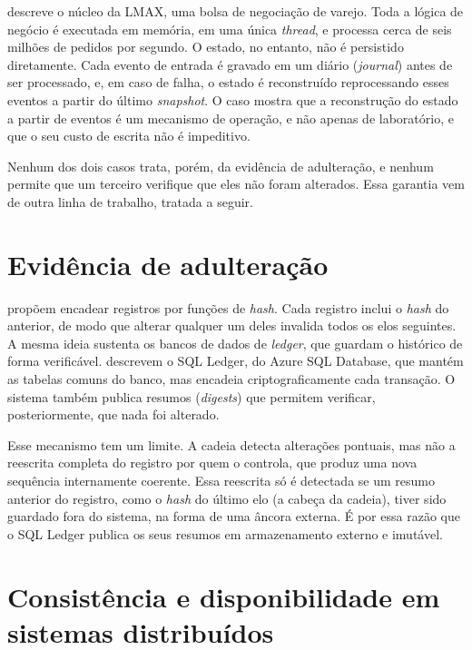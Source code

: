  descreve o núcleo da LMAX, uma bolsa de negociação de varejo. Toda a lógica de negócio é executada em memória, em uma única \textit{thread}, e processa cerca de seis milhões de pedidos por segundo. O estado, no entanto, não é persistido diretamente. Cada evento de entrada é gravado em um diário (\textit{journal}) antes de ser processado, e, em caso de falha, o estado é reconstruído reprocessando esses eventos a partir do último \textit{snapshot}. O caso mostra que a reconstrução do estado a partir de eventos é um mecanismo de operação, e não apenas de laboratório, e que o seu custo de escrita não é impeditivo.

Nenhum dos dois casos trata, porém, da evidência de adulteração, e nenhum permite que um terceiro verifique que eles não foram alterados. Essa garantia vem de outra linha de trabalho, tratada a seguir.

\section{Evidência de adulteração}\label{sec:adulteracao}

 propõem encadear registros por funções de \textit{hash}. Cada registro inclui o \textit{hash} do anterior, de modo que alterar qualquer um deles invalida todos os elos seguintes. A mesma ideia sustenta os bancos de dados de \textit{ledger}, que guardam o histórico de forma verificável.  descrevem o SQL Ledger, do Azure SQL Database, que mantém as tabelas comuns do banco, mas encadeia criptograficamente cada transação. O sistema também publica resumos (\textit{digests}) que permitem verificar, posteriormente, que nada foi alterado.

Esse mecanismo tem um limite. A cadeia detecta alterações pontuais, mas não a reescrita completa do registro por quem o controla, que produz uma nova sequência internamente coerente. Essa reescrita só é detectada se um resumo anterior do registro, como o \textit{hash} do último elo (a cabeça da cadeia), tiver sido guardado fora do sistema, na forma de uma âncora externa. É por essa razão que o SQL Ledger publica os seus resumos em armazenamento externo e imutável.

\section{Consistência e disponibilidade em sistemas distribuídos}\label{sec:distribuidos}

